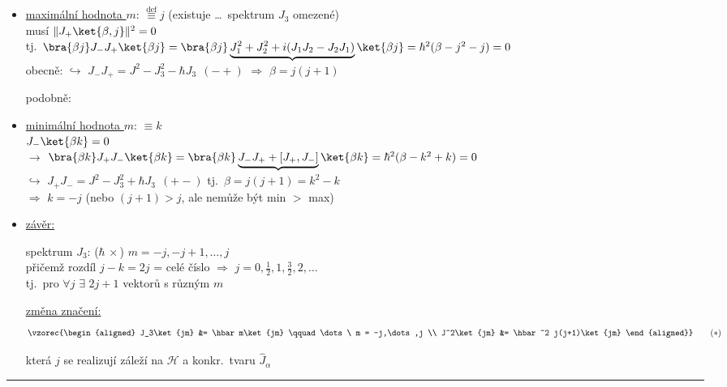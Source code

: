 \begin{itemize}
  \item \underline{maximální hodnota $m$}: $\overset{\text{def}}{\equiv} j$ \quad (existuje \dots\ spektrum $J_3$ omezené) \\
  musí \quad $\|J_+\ket{\beta,j}\|^2 = 0$ \\
  tj.\ \quad $\bra{\beta j}J_-J_+\ket{\beta j} = \bra{\beta j}\underbrace{J_1^2 + J_2^2 + i(J_1J_2 - J_2J_1)}\ket{\beta j} = \hbar^2(\beta - j^2 - j) = 0$ \\
  obecně: \quad $\hookrightarrow$ \quad $\boxed{J_-J_+ = J^2 - J_3^2 - \hbar J_3}\ \ (-+)$
  \quad $\Rightarrow$ \quad \underline{$\beta = j(j+1)$}

  podobně:
  \item \underline{minimální hodnota $m$}: $\equiv k$ \\
  \quad $J_-\ket{\beta k} = 0$ \\
  $\to$ $\bra{\beta k}J_+J_-\ket{\beta k} = \bra{\beta k}\underbrace{J_-J_+ + [J_+,J_-]}\ket{\beta k} = \hbar^2(\beta - k^2 + k) = 0$ \\
  \quad $\hookrightarrow$ \quad $\boxed{J_+J_- = J^2 - J_3^2 + \hbar J_3}\ \ (+-)$ \quad tj.\ $\beta = j(j+1) = k^2 - k$ \\
  \hspace*{5cm} $\Rightarrow$ \quad \underline{$k = -j$} \quad (nebo $(j+1) > j$, ale nemůže být min $>$ max)

  \item \underline{závěr:}
  \begin{veta}
    spektrum $J_3$: ($\hbar\,\times$) \quad $m = -j, -j+1,\dots,j$ \\
    \quad přičemž rozdíl $j - k = 2j$ = celé číslo $\Rightarrow$ \quad $j = 0,\tfrac12,1,\tfrac32,2,\dots$ \\
    tj.\ pro $\forall j$ $\exists$ $2j+1$ vektorů s různým $m$

    \underline{změna značení:}
    \[
      \vzorec{\begin{aligned}
        J_3\ket{jm} &= \hbar m\ket{jm} \qquad\dots\ m = -j,\dots,j \\
        J^2\ket{jm} &= \hbar^2 j(j+1)\ket{jm}
      \end{aligned}} \qquad (*)
    \]
  \end{veta}
  která $j$ se realizují záleží na $\mathcal{H}$ a konkr.\ tvaru $\hat J_\alpha$
\end{itemize}
\rule{0.75\linewidth}{0.3pt}

